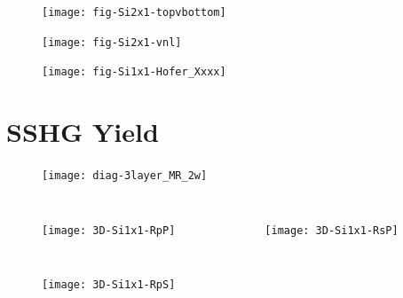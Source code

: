 \documentclass{beamer}
\begin{document}
\begin{frame}
\begin{figure}
\centering
\texttt{[image: fig-Si2x1-topvbottom]}
\end{figure}
\end{frame}

\begin{frame}
\begin{figure}
\centering
\texttt{[image: fig-Si2x1-vnl]}
\end{figure}
\end{frame}

\begin{frame}
\begin{figure}
\centering
\texttt{[image: fig-Si1x1-Hofer\_Xxxx]}
\end{figure}
\end{frame}



\section{SSHG Yield}

\begin{frame}
\begin{figure}
\centering
\texttt{[image: diag-3layer\_MR\_2w]}
\end{figure}
\end{frame}

\begin{frame}
\begin{columns}
\begin{figure}
\centering
\texttt{[image: 3D-Si1x1-RpP]}
\end{figure}
\begin{figure}
\centering
\texttt{[image: 3D-Si1x1-RsP]}
\end{figure}
\end{columns}
\end{frame}

\begin{frame}
\begin{figure}
\centering
\texttt{[image: 3D-Si1x1-RpS]}
\end{figure}
\end{frame}
\end{document}
